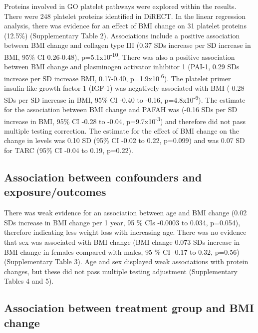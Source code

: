 \documentclass[11pt,twoside]{bristolthesis}
\begin{document}
Proteins involved in GO platelet pathways were explored within the results. There were 248 platelet proteins identified in DiRECT. In the linear regression analysis, there was evidence for an effect of BMI change on 31 platelet proteins (12.5\%) (Supplementary Table 2). Associations include a positive association between BMI change and collagen type III (0.37 SDs increase per SD increase in BMI, 95\% CI 0.26-0.48), p=5.1x10\textsuperscript{-10}. There was also a positive association between BMI change and plasminogen activator inhibitor 1 (PAI-1, 0.29 SDs increase per SD increase BMI, 0.17-0.40, p=1.9x10\textsuperscript{-6}). The platelet primer insulin-like growth factor 1 (IGF-1) was negatively associated with BMI (-0.28 SDs per SD increase in BMI, 95\% CI -0.40 to -0.16, p=4.8x10\textsuperscript{-6}). The estimate for the association between BMI change and PAFAH was (-0.16 SDs per SD increase in BMI, 95\% CI -0.28 to -0.04, p=9.7x10\textsuperscript{-3}) and therefore did not pass multiple testing correction. The estimate for the effect of BMI change on the change in levels was 0.10 SD (95\% CI -0.02 to 0.22, p=0.099) and was 0.07 SD for TARC (95\% CI -0.04 to 0.19, p=0.22).

\hypertarget{association-between-confounders-and-exposureoutcomes}{%
\subsection{Association between confounders and exposure/outcomes}\label{association-between-confounders-and-exposureoutcomes}}

There was weak evidence for an association between age and BMI change (0.02 SDs increase in BMI change per 1 year, 95 \% CIs -0.0003 to 0.034, p=0.054), therefore indicating less weight loss with increasing age. There was no evidence that sex was associated with BMI change (BMI change 0.073 SDs increase in BMI change in females compared with males, 95 \% CI -0.17 to 0.32, p=0.56) (Supplementary Table 3). Age and sex displayed weak associations with protein changes, but these did not pass multiple testing adjustment (Supplementary Tables 4 and 5).

\hypertarget{association-between-treatment-group-and-bmi-change}{%
\subsection{Association between treatment group and BMI change}\label{association-between-treatment-group-and-bmi-change}}
\end{document}
